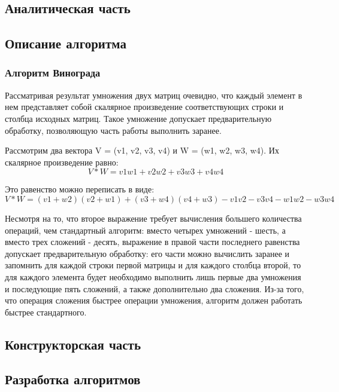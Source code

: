\documentclass[a4paper,12pt]{article}
\begin{document}
    \begin{center}
        \section{Аналитическая часть}
	    \subsection{Описание алгоритма}
    \end{center}
\subsubsection{Алгоритм Винограда}
Рассматривая результат умножения двух матриц очевидно, что каждый элемент в нем представляет собой скалярное произведение соответствующих строки и столбца исходных матриц. Такое умножение допускает предварительную обработку, позволяющую часть работы выполнить заранее.

Рассмотрим два вектора V = (v1, v2, v3, v4) и W = (w1, w2, w3, w4). Их скалярное произведение равно: \begin{equation}V * W = v1w1 + v2w2 + v3w3 + v4w4
\end{equation}

Это равенство можно переписать в виде: \begin{equation}V * W = (v1 + w2)(v2 + w1) + (v3 + w4)(v4 + w3) - v1v2 - v3v4 - w1w2 - w3w4
\end{equation}

Несмотря на то, что второе выражение требует вычисления большего количества операций, чем стандартный алгоритм: вместо четырех умножений - шесть, а вместо трех сложений - десять, выражение в правой части последнего равенства допускает предварительную обработку: его части можно вычислить заранее и запомнить для каждой строки первой матрицы и для каждого столбца второй, то для каждого элемента будет необходимо выполнить лишь первые два умножения и последующие пять сложений, а также дополнительно два сложения. Из-за того, что операция сложения быстрее операции умножения, алгоритм должен работать быстрее стандартного.

    \newpage

    \begin{center}
        \section{Конструкторская часть}
        \subsection{Разработка алгоритмов}
    \end{center}
\end{document}
